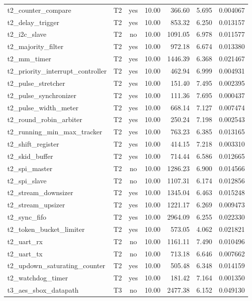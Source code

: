 \begin{tabular}{llcrrrr}
t2\_counter\_compare & T2 & yes & 10.00 & 366.60 & 5.695 & 0.004067 \\
t2\_delay\_trigger & T2 & yes & 10.00 & 853.32 & 6.250 & 0.013157 \\
t2\_i2c\_slave & T2 & no & 10.00 & 1091.05 & 6.978 & 0.011577 \\
t2\_majority\_filter & T2 & yes & 10.00 & 972.18 & 6.674 & 0.013380 \\
t2\_mm\_timer & T2 & yes & 10.00 & 1446.39 & 6.368 & 0.021467 \\
t2\_priority\_interrupt\_controller & T2 & yes & 10.00 & 462.94 & 6.999 & 0.004931 \\
t2\_pulse\_stretcher & T2 & yes & 10.00 & 151.40 & 7.495 & 0.002395 \\
t2\_pulse\_synchronizer & T2 & yes & 10.00 & 111.36 & 7.695 & 0.000437 \\
t2\_pulse\_width\_meter & T2 & yes & 10.00 & 668.14 & 7.127 & 0.007474 \\
t2\_round\_robin\_arbiter & T2 & yes & 10.00 & 250.24 & 7.198 & 0.002543 \\
t2\_running\_min\_max\_tracker & T2 & yes & 10.00 & 763.23 & 6.385 & 0.013165 \\
t2\_shift\_register & T2 & yes & 10.00 & 414.15 & 7.218 & 0.003310 \\
t2\_skid\_buffer & T2 & yes & 10.00 & 714.44 & 6.586 & 0.012665 \\
t2\_spi\_master & T2 & no & 10.00 & 1286.23 & 6.900 & 0.014566 \\
t2\_spi\_slave & T2 & no & 10.00 & 1107.31 & 6.174 & 0.012856 \\
t2\_stream\_downsizer & T2 & yes & 10.00 & 1345.04 & 6.463 & 0.015248 \\
t2\_stream\_upsizer & T2 & yes & 10.00 & 1221.17 & 6.269 & 0.009473 \\
t2\_sync\_fifo & T2 & yes & 10.00 & 2964.09 & 6.255 & 0.022330 \\
t2\_token\_bucket\_limiter & T2 & yes & 10.00 & 573.05 & 4.062 & 0.021821 \\
t2\_uart\_rx & T2 & no & 10.00 & 1161.11 & 7.490 & 0.010496 \\
t2\_uart\_tx & T2 & no & 10.00 & 713.18 & 6.646 & 0.007662 \\
t2\_updown\_saturating\_counter & T2 & yes & 10.00 & 505.48 & 6.348 & 0.014159 \\
t2\_watchdog\_timer & T2 & yes & 10.00 & 181.42 & 7.164 & 0.001350 \\
t3\_aes\_sbox\_datapath & T3 & no & 10.00 & 2477.38 & 6.152 & 0.049130 \\

\end{tabular}
